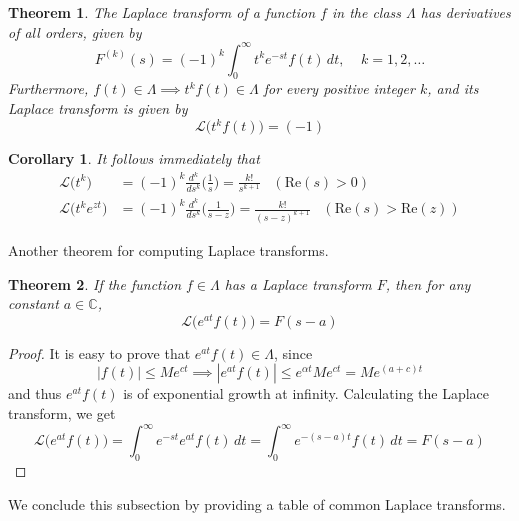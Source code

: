 \documentclass{article}
\newtheorem{theorem}{Theorem}[section]
\newtheorem{corollary}{Corollary}[theorem]
\theoremstyle{remark}
\theoremstyle{definition}
\begin{document}
    \begin{theorem}
    The Laplace transform of a function $f$ in the class $\Lambda$ has derivatives of all orders, given by
    \[F^{(k)} (s) = (-1)^k \int_0^\infty t^k e^{-st} f(t)\,dt, \;\;\;\; k = 1, 2, \ldots\]
    Furthermore, $f(t) \in \Lambda \implies t^k f(t) \in \Lambda$ for every positive integer $k$, and its Laplace transform is given by
    \[\mathcal{L}\big( t^k f(t) \big) = (-1)\]
    \end{theorem}

    \begin{corollary}
    It follows immediately that
    \begin{align*}
        \mathcal{L}\big( t^k\big) & = (-1)^k \frac{d^k}{d s^k} \bigg( \frac{1}{s} \bigg) = \frac{k!}{s^{k+1}} \;\;\; (\text{Re}(s) > 0) \\
        \mathcal{L}\big( t^k e^{zt}\big) & = (-1)^k \frac{d^k}{ds^k} \bigg( \frac{1}{s-z} \bigg) = \frac{k!}{(s-z)^{k+1}} \;\;\; (\text{Re}(s) > \text{Re}(z))
    \end{align*}
    \end{corollary}

    Another theorem for computing Laplace transforms. 

    \begin{theorem}
    If the function $f \in \Lambda$ has a Laplace transform $F$, then for any constant $a \in \mathbb{C}$, 
    \[\mathcal{L}\big(e^{at} f(t) \big) = F(s-a)\]
    \end{theorem}
    \begin{proof}
    It is easy to prove that $e^{at} f(t) \in \Lambda$, since 
    \[|f(t)| \leq M e^{ct} \implies |e^{at} f(t)| \leq e^{\alpha t} M e^{ct} = M e^{(a+c)t}\]
    and thus $e^{at} f(t)$ is of exponential growth at infinity. Calculating the Laplace transform, we get
    \[\mathcal{L}\big(e^{at} f(t) \big) = \int_0^\infty e^{-st} e^{at} f(t) \,dt = \int_0^\infty e^{-(s-a)t} f(t) \,dt = F(s - a)\]
    \end{proof}

    We conclude this subsection by providing a table of common Laplace transforms. 
\end{document}
